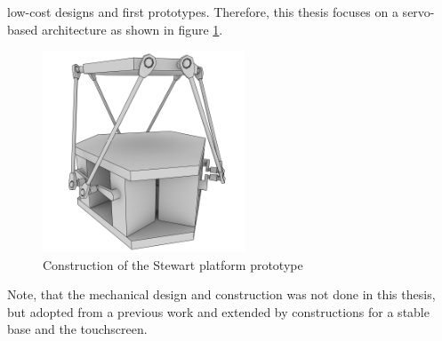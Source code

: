 low-cost designs and first prototypes. Therefore, this thesis focuses on a
servo-based architecture as shown in figure \ref{fig:stewart}.
\begin{figure}
	\centering
	\includegraphics[width=6cm]{../figures/stewart}
	\caption{Construction of the Stewart platform prototype}
	\label{fig:stewart}
\end{figure}
Note, that the mechanical design and construction was not done in this thesis,
but adopted from a previous work and extended by constructions for a stable
base and the touchscreen.


